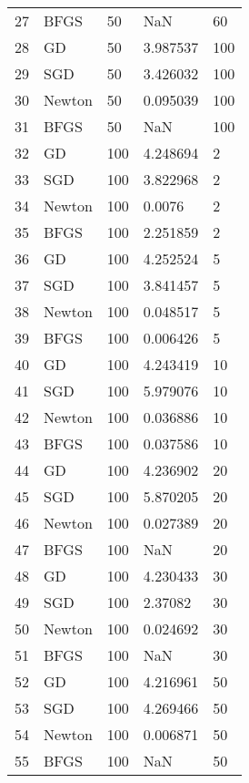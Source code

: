 \begin{tabular}{lllll}
27  &    BFGS &       50 &        NaN &     60 \\
28  &      GD &       50 &   3.987537 &    100 \\
29  &     SGD &       50 &   3.426032 &    100 \\
30  &  Newton &       50 &   0.095039 &    100 \\
31  &    BFGS &       50 &        NaN &    100 \\
32  &      GD &      100 &   4.248694 &      2 \\
33  &     SGD &      100 &   3.822968 &      2 \\
34  &  Newton &      100 &     0.0076 &      2 \\
35  &    BFGS &      100 &   2.251859 &      2 \\
36  &      GD &      100 &   4.252524 &      5 \\
37  &     SGD &      100 &   3.841457 &      5 \\
38  &  Newton &      100 &   0.048517 &      5 \\
39  &    BFGS &      100 &   0.006426 &      5 \\
40  &      GD &      100 &   4.243419 &     10 \\
41  &     SGD &      100 &   5.979076 &     10 \\
42  &  Newton &      100 &   0.036886 &     10 \\
43  &    BFGS &      100 &   0.037586 &     10 \\
44  &      GD &      100 &   4.236902 &     20 \\
45  &     SGD &      100 &   5.870205 &     20 \\
46  &  Newton &      100 &   0.027389 &     20 \\
47  &    BFGS &      100 &        NaN &     20 \\
48  &      GD &      100 &   4.230433 &     30 \\
49  &     SGD &      100 &    2.37082 &     30 \\
50  &  Newton &      100 &   0.024692 &     30 \\
51  &    BFGS &      100 &        NaN &     30 \\
52  &      GD &      100 &   4.216961 &     50 \\
53  &     SGD &      100 &   4.269466 &     50 \\
54  &  Newton &      100 &   0.006871 &     50 \\
55  &    BFGS &      100 &        NaN &     50 \\

\end{tabular}
